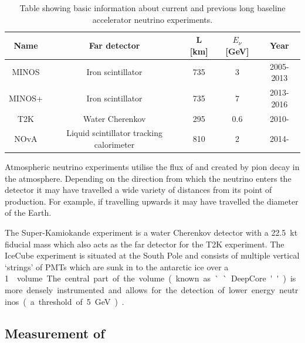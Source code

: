 \begin{table}
  \caption{Table showing basic information about current and previous long baseline accelerator neutrino experiments.}
  \label{tab:lblExp}
  \centering
  \begin{tabular}{c c c c c}
    \hline
    \hline
    Name & Far detector & L [\si{\kilo\metre}] & $E_{\nu}$ [\si{\giga\electronvolt}] & Year \\
    \hline
    MINOS  & Iron scintillator                  & 735 & 3   & 2005-2013 \\
    MINOS+ & Iron scintillator                  & 735 & 7   & 2013-2016 \\
    T2K    & Water Cherenkov                        & 295 & 0.6 & 2010- \\
    NOvA   & Liquid scintillator tracking calorimeter & 810 & 2   & 2014- \\
    \hline
  \end{tabular}
\end{table}

Atmospheric neutrino experiments utilise the flux of \numu and \nue created by pion decay in the atmosphere.
Depending on the direction from which the neutrino enters the detector it may have travelled a wide variety of distances from its point of production.
For example, if travelling upwards it may have travelled the diameter of the Earth.

The Super-Kamiokande experiment is a water Cherenkov detector with a \SI{22.5}{\kilo\tonne} fiducial mass which also acts as the far detector for the T2K experiment.
The IceCube experiment is situated at the South Pole and consists of multiple vertical `strings' of PMTs which are sunk in to the antarctic ice over a \SI{1}{\km\cubic} volume.
The central part of the volume (known as ``DeepCore'') is more densely instrumented and allows for the detection of lower energy neutrinos (a threshold of \SI{5}{\giga\electronvolt})~\cite{icecube}.

\subsection{Measurement of \dcp}
\label{sec:theory:currentState:dcp}


